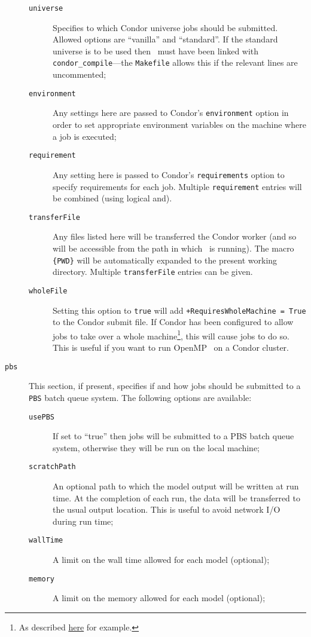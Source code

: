 \begin{description}
\begin{description}
\item[{\tt universe}] Specifies to which {\sc Condor} universe jobs should be submitted. Allowed options are ``vanilla'' and ``standard''. If the standard universe is to be used then \glc\ must have been linked with {\tt condor\_compile}---the {\tt Makefile} allows this if the relevant lines are uncommented;
\item[{\tt environment}] Any settings here are passed to {\sc Condor}'s {\tt environment} option in order to set appropriate environment variables on the machine where a job is executed;
\item[{\tt requirement}] Any setting here is passed to {\sc Condor}'s {\tt requirements} option to specify requirements for each job. Multiple {\tt requirement} entries will be combined (using logical and).
\item[{\tt transferFile}] Any files listed here will be transferred the Condor worker (and so will be accessible from the path in which \glc\ is running). The macro {\tt \{PWD\}} will be automatically expanded to the present working directory. Multiple {\tt transferFile} entries can be given.
\item [{\tt wholeFile}] Setting this option to {\tt true} will add {\tt +RequiresWholeMachine = True} to the Condor submit file. If Condor has been configured to allow jobs to take over a whole machine\footnote{As described \protect\href{https://www-auth.cs.wisc.edu/lists/condor-users/2009-January/msg00086.shtml}{here} for example.}, this will cause jobs to do so. This is useful if you want to run OpenMP \glc\ on a Condor cluster.
\end{description}
\item[{\tt pbs}] This section, if present, specifies if and how jobs should be submitted to a {\tt PBS} batch queue system. The following options are available:
\begin{description}
\item[{\tt usePBS}] If set to ``true'' then jobs will be submitted to a {\sc PBS} batch queue system, otherwise they will be run on the local machine;
\item[{\tt scratchPath}] An optional path to which the model output will be written at run time. At the completion of each run, the data will be transferred to the usual output location. This is useful to avoid network I/O during run time;
\item[{\tt wallTime}] A limit on the wall time allowed for each model (optional);
\item[{\tt memory}] A limit on the memory allowed for each model (optional);

\end{description}
\end{description}
